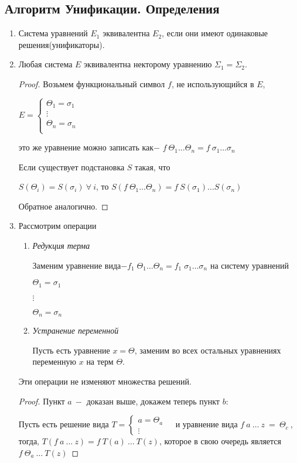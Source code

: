 		\subsection{Алгоритм Унификации. Определения}
		\begin{enumerate}
			\item Система уравнений $E_1$ эквивалентна $E_2$, если они имеют одинаковые решения(унификаторы).
			\item Любая система $E$ эквивалентна некторому уравнению $\Sigma_1=\Sigma_2$.

	\begin{proof}
		Возьмем функциональный символ $f$, не использующийся в $E$, \par
		$
		E=\begin{cases}
			\Theta_1=\sigma_1&\\
			\vdots&\\
			\Theta_n=\sigma_n&\\
		\end{cases}
		$\par
		это же уравнение можно записать как$-$ $f\:\Theta_1\hdots\Theta_n=f\:\sigma_1 \hdots\sigma_n$\par
		Если существует подстановка $S$ такая, что\par $S(\Theta_i)=S(\sigma_i)\:\forall\:i$,
		то $S(f\:\Theta_1\hdots\Theta_n)=f\:S(\sigma_1)\hdots S(\sigma_n)$ \par Обратное аналогично.\end{proof}
		\item Рассмотрим операции
		\begin{enumerate}
			\item \textit{Редукция терма} \par
					Заменим уравнение вида$-f_1\;\Theta_1 \hdots\Theta_n=f_1\;\sigma_1\hdots\sigma_n$ на систему уравнений\par$\Theta_1=\sigma_1$\par$\vdots$\par$\Theta_n=\sigma_n$
			\item \textit{Устранение переменной} \par
			Пусть есть уравнение $x=\Theta$, заменим во всех остальных уравнениях переменную $x$ на терм $\Theta$.
		\end{enumerate}
		\begin{statement} Эти операции не изменяют множества решений.
		\end{statement}
		\begin{proof} Пункт $a\:-$ доказан выше, докажем теперь пункт $b:$\par Пусть есть решение вида $T = \begin{cases} a = \Theta_a &\\ \vdots \end{cases}$
		и уравнение вида $f\:a\:\hdots\:z\:=\:\Theta_c\:$, тогда, $T(f\:a\:\hdots\:z) = f\:T(a)\:\hdots\:T(z)$, которое в свою очередь является $f\: \Theta_a\:\hdots\:T(z)$
		\end{proof}
	\end{enumerate}
